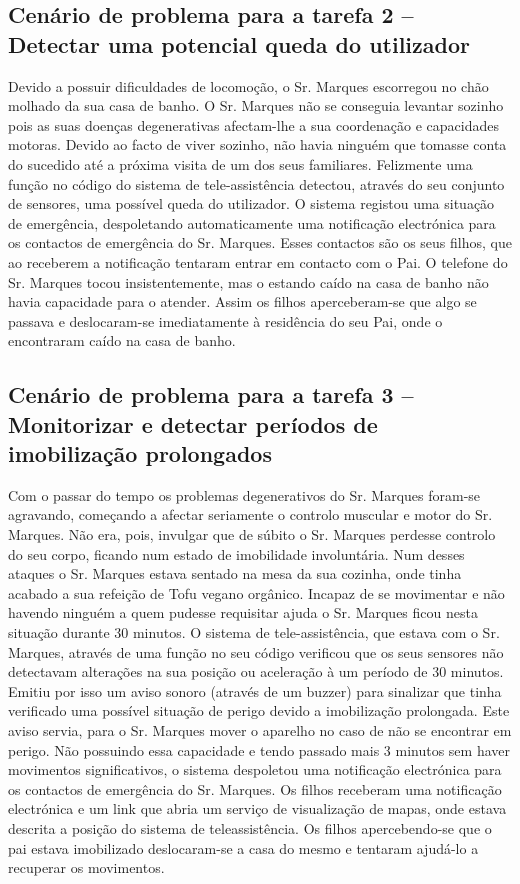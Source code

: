 \subsection{Cenário de problema para a tarefa 2 – Detectar uma potencial queda do utilizador}

Devido a possuir dificuldades de locomoção, o Sr. Marques escorregou no chão molhado da sua casa de banho. O Sr. Marques não se conseguia levantar sozinho pois as suas doenças degenerativas afectam-lhe a sua coordenação e capacidades motoras.
Devido ao facto de viver sozinho, não havia ninguém que tomasse conta do sucedido até a próxima visita de um dos seus familiares. Felizmente uma função no código do sistema de tele-assistência detectou, através do seu conjunto de sensores, uma possível queda do utilizador.
O sistema registou uma situação de emergência, despoletando automaticamente uma notificação electrónica para os contactos de emergência do Sr. Marques.
Esses contactos são os seus filhos, que ao receberem a notificação tentaram entrar em contacto com o Pai. O telefone do Sr. Marques tocou insistentemente, mas o estando caído na casa de banho não havia capacidade para o atender. Assim os filhos aperceberam-se que algo se passava e deslocaram-se imediatamente à residência do seu Pai, onde o encontraram caído na casa de banho. 


\subsection{Cenário de problema para a tarefa 3 – Monitorizar e detectar períodos de imobilização prolongados}

Com o passar do tempo os problemas degenerativos do Sr. Marques foram-se agravando, começando a afectar seriamente o controlo muscular e motor do Sr. Marques. Não era, pois, invulgar que de súbito o Sr. Marques perdesse controlo do seu corpo, ficando num estado de imobilidade involuntária.
Num desses ataques o Sr. Marques estava sentado na mesa da sua cozinha, onde tinha acabado a sua refeição de Tofu vegano orgânico. Incapaz de se movimentar e não havendo ninguém a quem pudesse requisitar ajuda o Sr. Marques ficou nesta situação durante 30 minutos. O sistema de tele-assistência, que estava com o Sr. Marques, através de uma função no seu código verificou que os seus sensores não detectavam alterações na sua posição ou aceleração à um período de 30 minutos. Emitiu por isso um aviso sonoro (através de um buzzer) para sinalizar que tinha verificado uma possível situação de perigo devido a imobilização prolongada. Este aviso servia, para o Sr. Marques mover o aparelho no caso de não se encontrar em perigo. Não possuindo essa capacidade e tendo passado mais 3 minutos sem haver movimentos significativos, o sistema despoletou uma notificação electrónica para os contactos de emergência do Sr. Marques. Os filhos receberam uma notificação electrónica e um link que abria um serviço de visualização de mapas, onde estava descrita a posição do sistema de teleassistência.
Os filhos apercebendo-se que o pai estava imobilizado deslocaram-se a casa do mesmo e tentaram ajudá-lo a recuperar os movimentos.


